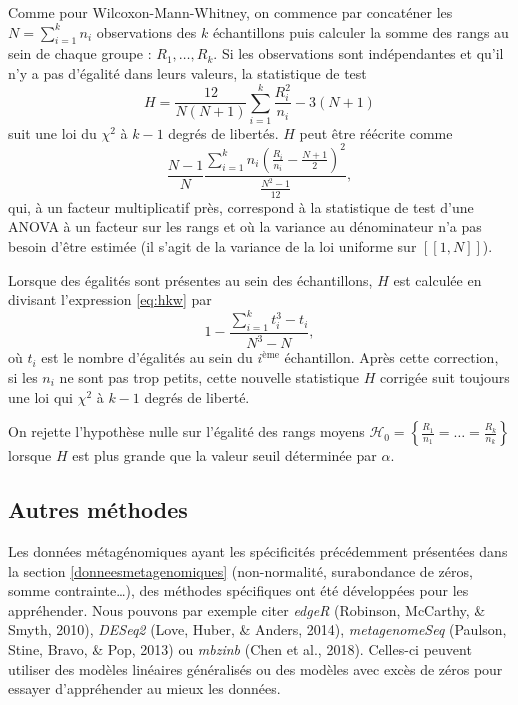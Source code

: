 \documentclass[12pt,a4paper]{reedthesis}
\theoremstyle{definition}
\theoremstyle{definition}
\theoremstyle{definition}
\theoremstyle{remark}
\begin{document}
Comme pour Wilcoxon-Mann-Whitney, on commence par concaténer les \(N = \sum_{i = 1}^{k}n_i\) observations des \(k\) échantillons puis calculer la somme des rangs au sein de chaque groupe : \(R_1, \ldots, R_k\). Si les observations sont indépendantes et qu'il n'y a pas d'égalité dans leurs valeurs, la statistique de test
\begin{equation}
\label{eq:hkw}
H = \frac{12}{N (N + 1)} \sum_{i=1}^{k} \frac{R_i^2}{n_i} - 3(N + 1)
\end{equation}
suit une loi du \(\chi^2\) à \(k - 1\) degrés de libertés. \(H\) peut être réécrite comme
\begin{equation*}
\frac{N - 1}{N} \frac{ \sum_{i=1}^k n_i \left(\frac{R_i}{n_i} - \frac{N + 1}{2}\right)^2}{\frac{N^2-1}{12}},
\end{equation*}
qui, à un facteur multiplicatif près, correspond à la statistique de test d'une ANOVA à un facteur sur les rangs et où la variance au dénominateur n'a pas besoin d'être estimée (il s'agit de la variance de la loi uniforme sur \([\![1,N]\!]\)).

Lorsque des égalités sont présentes au sein des échantillons, \(H\) est calculée en divisant l'expression \eqref{eq:hkw} par
\begin{equation*}
1-\frac{\sum_{i = 1}^k t_i^3 - t_i}{N^3 - N},
\end{equation*}
où \(t_i\) est le nombre d'égalités au sein du \(i^{\text{ème}}\) échantillon. Après cette correction, si les \(n_i\) ne sont pas trop petits, cette nouvelle statistique \(H\) corrigée suit toujours une loi qui \(\chi^2\) à \(k - 1\) degrés de liberté.

On rejette l'hypothèse nulle sur l'égalité des rangs moyens \(\mathcal{H}_0 = \left\{ \frac{R_1}{n_1} = \ldots = \frac{R_k}{n_k} \right\}\) lorsque \(H\) est plus grande que la valeur seuil déterminée par \(\alpha\).

\hypertarget{autres-methodes}{%
\subsection{Autres méthodes}\label{autres-methodes}}

Les données métagénomiques ayant les spécificités précédemment présentées dans la section \ref{donneesmetagenomiques} (non-normalité, surabondance de zéros, somme contrainte\ldots), des méthodes spécifiques ont été développées pour les appréhender. Nous pouvons par exemple citer \emph{edgeR} (Robinson, McCarthy, \& Smyth, 2010), \emph{DESeq2} (Love, Huber, \& Anders, 2014), \emph{metagenomeSeq} (Paulson, Stine, Bravo, \& Pop, 2013) ou \emph{mbzinb} (Chen et al., 2018). Celles-ci peuvent utiliser des modèles linéaires généralisés ou des modèles avec excès de zéros pour essayer d'appréhender au mieux les données.
\end{document}
